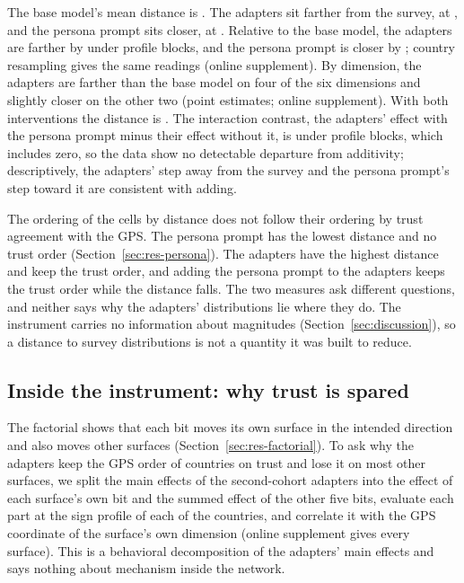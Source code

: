 The base model's mean distance is . The adapters sit farther from the survey, at , and the persona prompt sits closer, at . Relative to the base model, the adapters are farther by   under profile blocks, and the persona prompt is closer by  ; country resampling gives the same readings (online supplement). By dimension, the adapters are farther than the base model on four of the six dimensions and slightly closer on the other two (point estimates; online supplement). With both interventions the distance is . The interaction contrast, the adapters' effect with the persona prompt minus their effect without it, is   under profile blocks, which includes zero, so the data show no detectable departure from additivity; descriptively, the adapters' step away from the survey and the persona prompt's step toward it are consistent with adding.

The ordering of the cells by distance does not follow their ordering by trust agreement with the GPS. The persona prompt has the lowest distance and no trust order (Section~\ref{sec:res-persona}). The adapters have the highest distance and keep the trust order, and adding the persona prompt to the adapters keeps the trust order while the distance falls. The two measures ask different questions, and neither says why the adapters' distributions lie where they do. The instrument carries no information about magnitudes (Section~\ref{sec:discussion}), so a distance to survey distributions is not a quantity it was built to reduce.

\subsection{Inside the instrument: why trust is spared}\label{sec:res-w1}

The factorial shows that each bit moves its own surface in the intended direction and also moves other surfaces (Section~\ref{sec:res-factorial}). To ask why the adapters keep the GPS order of countries on trust and lose it on most other surfaces, we split the main effects of the second-cohort adapters into the effect of each surface's own bit and the summed effect of the other five bits, evaluate each part at the sign profile of each of the  countries, and correlate it with the GPS coordinate of the surface's own dimension (online supplement gives every surface). This is a behavioral decomposition of the adapters' main effects and says nothing about mechanism inside the network.

